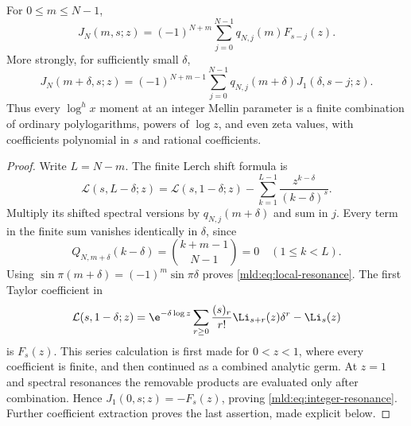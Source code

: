\begin{theorem}\label{mld:thm:integer-resonance}
For $0\le m\le N-1$,
\begin{equation}\label{mld:eq:integer-resonance}
 \boxed{\displaystyle
 J_N(m,s;z)=(-1)^{N+m}
       \sum_{j=0}^{N-1}q_{N,j}(m)F_{s-j}(z).}
\end{equation}
More strongly, for sufficiently small $\delta$,
\begin{equation}\label{mld:eq:local-resonance}
 J_N(m+\delta,s;z)=(-1)^{N+m-1}
       \sum_{j=0}^{N-1}q_{N,j}(m+\delta)
                                  J_1(\delta,s-j;z).
\end{equation}
Thus every $\log^h x$ moment at an integer Mellin parameter is a finite combination of ordinary polylogarithms, powers of $\log z$, and even zeta values, with coefficients polynomial in $s$ and rational coefficients.
\end{theorem}

\begin{proof}
Write $L=N-m$. The finite Lerch shift formula is
\[
 \mathcal L(s,L-\delta;z)=\mathcal L(s,1-\delta;z)
       -\sum_{k=1}^{L-1}\frac{z^{k-\delta}}{(k-\delta)^s}.
\]
Multiply its shifted spectral versions by $q_{N,j}(m+\delta)$ and sum in $j$. Every term in the finite sum vanishes identically in $\delta$, since
\[
 Q_{N,m+\delta}(k-\delta)
       =\binom{k+m-1}{N-1}=0\quad(1\le k<L).
\]
Using $\sin\pi(m+\delta)=(-1)^m\sin\pi\delta$ proves \eqref{mld:eq:local-resonance}. The first Taylor coefficient in
\[
 \mathcal L(s,1-\delta;z)
 =\e^{-\delta\log z}
       \sum_{r\ge0}\frac{(s)_r}{r!}\Li_{s+r}(z)\delta^r
       -\Li_s(z)
\]
is $F_s(z)$. This series calculation is first made for $0<z<1$,
where every coefficient is finite, and then continued as a combined
analytic germ. At $z=1$ and spectral resonances the removable
products are evaluated only after combination. Hence $J_1(0,s;z)=-F_s(z)$, proving \eqref{mld:eq:integer-resonance}. Further coefficient extraction proves the last assertion, made explicit below.
\end{proof}

